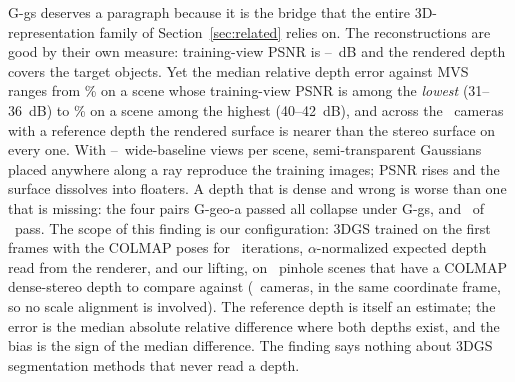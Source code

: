 \documentclass[journal]{IEEEtran}
\begin{document}
G-gs deserves a paragraph because it is the bridge that the entire
3D-representation family of Section~\ref{sec:related} relies on. The
reconstructions are good by their own measure: training-view PSNR is
\gsPSNRmin--\gsPSNRmax~dB and the rendered depth covers the target objects.
Yet the median relative depth error against MVS ranges from \gsDepthBest\% on a scene whose
training-view PSNR is among the \emph{lowest} (31--36~dB) to \gsDepthWorst\%
on a scene among the highest (40--42~dB), and across the \gsCams\ cameras with
a reference depth the rendered surface is nearer than the stereo surface on
every one. With \gsViewsMin--\gsViewsMax\ wide-baseline views per scene,
semi-transparent Gaussians placed
anywhere along a ray reproduce the training images; PSNR rises and the surface
dissolves into floaters. A depth that is dense and wrong is worse than
one that is missing: the four pairs G-geo-a passed all collapse under G-gs, and
\gateGeoC\ of \nGeoPairs\ pass. The scope of this finding is our configuration:
3DGS trained on the first frames with the COLMAP poses for \gsIter\ iterations,
$\alpha$-normalized expected depth read from the renderer, and our lifting, on
\gsScenes\ pinhole scenes that have a COLMAP dense-stereo depth to compare
against (\gsCams\ cameras, in the same coordinate frame, so no scale alignment
is involved). The reference depth is itself an estimate; the error is the median
absolute relative difference where both depths exist, and the bias is the sign
of the median difference. The finding says nothing about 3DGS segmentation
methods that never read a depth.
\end{document}
